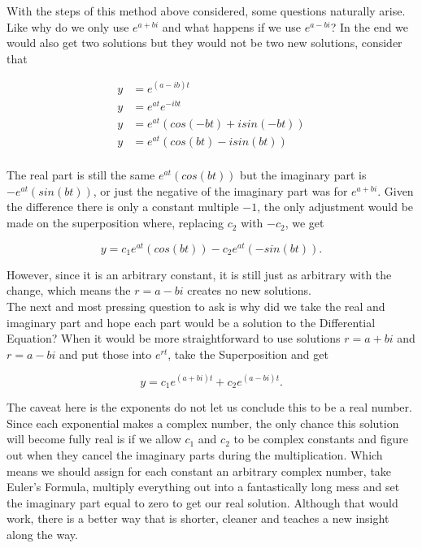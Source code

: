 \documentclass[12pt]{article}
\begin{document}
With the steps of this method above considered, some questions naturally arise. Like why do we only use $e^{a+bi}$ and what happens if we use $e^{a-bi}$? In the end we would also get two solutions but they would not be two new solutions, consider that 

\begin{align*}
    y &= e^{(a-ib)t} \\
    y &= e^{at}e^{-ibt} \\
    y &= e^{at}(cos(-bt)+isin(-bt)) \\
    y &= e^{at}(cos(bt)-isin(bt)) \\
\end{align*}

The real part is still the same $e^{at}(cos(bt))$ but the imaginary part is $-e^{at}(sin(bt))$, or just the negative of the imaginary part was for $e^{a+bi}$. Given the difference there is only a constant multiple $-1$, the only adjustment would be made on the superposition where, replacing $c_2$ with $-c_2$, we get

\begin{equation*}
    y = c_1e^{at}(cos(bt))-c_2e^{at}(-sin(bt)).
\end{equation*}

However, since it is an arbitrary constant, it is still just as arbitrary with the change, which means the $r=a-bi$ creates no new solutions. \\

The next and most pressing question to ask is why did we take the real and imaginary part and hope each part would be a solution to the Differential Equation? When it would be more straightforward to use solutions $r=a+bi$ and $r=a-bi$ and put those into $e^{rt}$, take the Superposition and get

\begin{equation*}
    y = c_1e^{(a+bi)t}+c_2e^{(a-bi)t}.
\end{equation*}

The caveat here is the exponents do not let us conclude this to be a real number. Since each exponential makes a complex number, the only chance this solution will become fully real is if we allow $c_1$ and $c_2$ to be complex constants and figure out when they cancel the imaginary parts during the multiplication. Which means we should assign for each constant an arbitrary complex number, take Euler's Formula, multiply everything out into a fantastically long mess and set the imaginary part equal to zero to get our real solution. Although that would work, there is a better way that is shorter, cleaner and teaches a new insight along the way. \\
\end{document}
